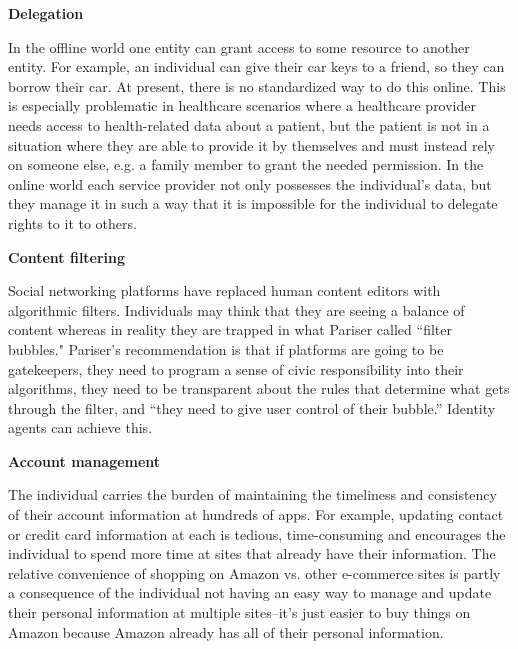 \documentclass[11pt, oneside]{article}   	%
\begin{document}
\textbf{Delegation}

In the offline world one entity can grant access to some resource to another entity. For example, an individual can give their car keys to a friend, so they can borrow their car. At present, there is no standardized way to do this online. This is especially problematic in healthcare scenarios where a healthcare provider needs access to health-related data about a patient, but the patient is not in a situation where they are able to provide it by themselves and must instead rely on someone else, e.g. a family member to grant the needed permission. In the online world each service provider not only possesses the individual's data, but they manage it in such a way that it is impossible for the individual to delegate rights to it to others. 

\textbf{Content filtering}

Social networking platforms have replaced human content editors with algorithmic filters. Individuals may think that they are seeing a balance of content whereas in reality they are trapped in what Pariser called ``filter bubbles."\cite{Pariser2011} Pariser's recommendation is that if platforms are going to be gatekeepers, they need to program a sense of civic responsibility into their algorithms, they need to be transparent about the rules that determine what gets through the filter, and ``they need to give user control of their bubble.''\cite[p66]{McNamee2020} Identity agents can achieve this.

\textbf{Account management} 

The individual carries the burden of maintaining the timeliness and consistency of their account information at hundreds of apps. For example, updating contact or credit card information at each is tedious, time-consuming and encourages the individual to spend more time at sites that already have their information. The relative convenience of shopping on Amazon vs. other e-commerce sites is partly a consequence of the individual not having an easy way to manage and update their personal information at multiple sites--it's just easier to buy things on Amazon because Amazon already has all of their personal information.

\end{document}
